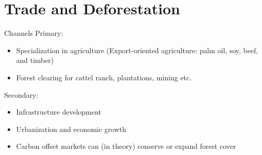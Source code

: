 \documentclass{beamer}
\begin{document}
\section{Trade and Deforestation}
\begin{frame}{Channels} 
Primary:
    \begin{itemize}
        \item Specialization in agriculture (Export-oriented agriculture: palm oil, soy, beef, and timber) %
        \item Forest clearing for cattel ranch, plantations, mining etc.
        \end{itemize}
        Secondary:
        \begin{itemize}
        \item Infrastructure development %
        \item Urbanization and economic growth %
        \item Carbon offset markets can (in theory) conserve or expand forest cover
    \end{itemize}
\end{frame}
\end{document}
